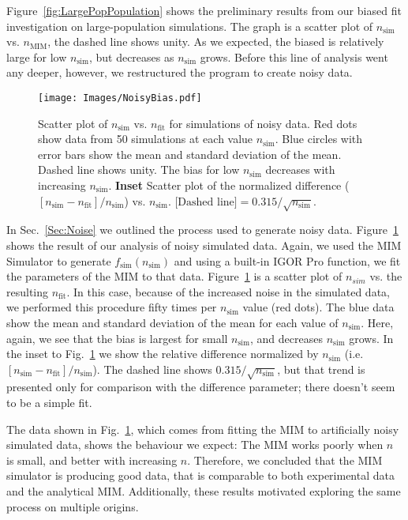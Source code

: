 		Figure~\ref{fig:LargePopPopulation} shows the preliminary results from our biased fit investigation on large-population simulations.
		The graph is a scatter plot of $n_\text{sim}$ vs. $n_\text{MIM}$, the dashed line shows unity.
		As we expected, the biased is relatively large for low $n_\text{sim}$, but decreases as $n_\text{sim}$ grows.
		Before this line of analysis went any deeper, however, we restructured the program to create noisy data.
		
		\begin{figure}[tbh]
			\begin{center}
				\texttt{[image: Images/NoisyBias.pdf]}
			\end{center}
				\caption[Bias in MIM fit on Noisy Data]{\label{fig:NoisyBias} Scatter plot of $n_\text{sim}$ vs. $n_\text{fit}$ for simulations of noisy data.
				Red dots show data from 50 simulations at each value $n_\text{sim}$.
				Blue circles with error bars show the mean and standard deviation of the mean.
				Dashed line shows unity.
				The bias for low $n_\text{sim}$ decreases with increasing $n_\text{sim}$.
				\textbf{Inset} Scatter plot of the normalized difference ($[n_\text{sim} - n_\text{fit}]/n_\text{sim}$) vs. $n_\text{sim}$.
				$\text{[Dashed line]} = 0.315/\sqrt{n_\text{sim}}$.
				}
		\end{figure}
		
		In Sec.~\ref{Sec:Noise} we outlined the process used to generate noisy data.
		Figure~\ref{fig:NoisyBias} shows the result of our analysis of noisy simulated data.
		Again, we used the MIM Simulator to generate $f_\text{sim}(n_\text{sim})$ and using a built-in IGOR Pro function, we fit the parameters of the MIM to that data.
		Figure~\ref{fig:NoisyBias} is a scatter plot of $n_{sim}$ vs. the resulting $n_\text{fit}$.
		In this case, because of the increased noise in the simulated data, we performed this procedure fifty times per $n_\text{sim}$ value (red dots).
		The blue data show the mean and standard deviation of the mean for each value of $n_\text{sim}$.
		Here, again, we see that the bias is largest for small $n_\text{sim}$, and decreases $n_\text{sim}$ grows.
		In the inset to Fig.~\ref{fig:NoisyBias} we show the relative difference normalized by $n_\text{sim}$ (i.e. $[n_\text{sim} - n_\text{fit}]/n_\text{sim}$).
		The dashed line shows $0.315/\sqrt{n_\text{sim}}$, but that trend is presented only for comparison with the difference parameter; there doesn't seem to be a simple fit.
		
		The data shown in Fig.~\ref{fig:NoisyBias}, which comes from fitting the MIM to artificially noisy simulated data, shows the behaviour we expect:
		The MIM works poorly when $n$ is small, and better with increasing $n$.
		Therefore, we concluded that the MIM simulator is producing good data, that is comparable to both experimental data and the analytical MIM.
		Additionally, these results motivated exploring the same process on multiple origins.
		
